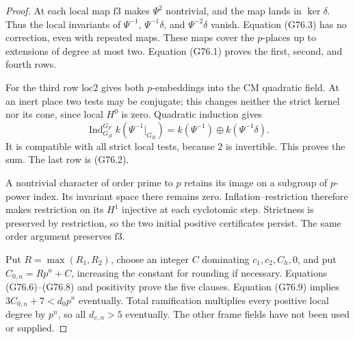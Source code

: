 \begin{proof}
At each local map \(\mathrm{f3}\) makes \(\Psi^2\) nontrivial, and the map lands in \(\ker\delta\). Thus the local invariants of \(\Psi^{-1}\), \(\Psi^{-1}\delta\), and \(\Psi^{-2}\delta\) vanish. Equation (G76.3) has no correction, even with repeated maps. These maps cover the \(p\)-places up to extensions of degree at most two. Equation (G76.1) proves the first, second, and fourth rows.

For the third row \(\mathrm{loc2}\) gives both \(p\)-embeddings into the CM quadratic field. At an inert place two tests may be conjugate; this changes neither the strict kernel nor its cone, since local \(H^0\) is zero. Quadratic induction gives
\[
 \operatorname{Ind}_{G_B}^{G_F}k(\Psi^{-1}|_{G_B})
       =k(\Psi^{-1})\oplus k(\Psi^{-1}\delta).
\]
It is compatible with all strict local tests, because \(2\) is invertible. This proves the sum. The last row is (G76.2).

A nontrivial character of order prime to \(p\) retains its image on a subgroup of \(p\)-power index. Its invariant space there remains zero. Inflation--restriction therefore makes restriction on its \(H^1\) injective at each cyclotomic step. Strictness is preserved by restriction, so the two initial positive certificates persist. The same order argument preserves \(\mathrm{f3}\).

Put \(R=\max(R_1,R_2)\), choose an integer \(C\) dominating \(c_1,c_2,C_h,0\), and put \(C_{0,n}=Rp^n+C\), increasing the constant for rounding if necessary. Equations (G76.6)--(G76.8) and positivity prove the five clauses. Equation (G76.9) implies \(3C_{0,n}+7<d_0p^n\) eventually. Total ramification multiplies every positive local degree by \(p^n\), so all \(d_{v,n}>5\) eventually. The other frame fields have not been used or supplied.
\end{proof}

